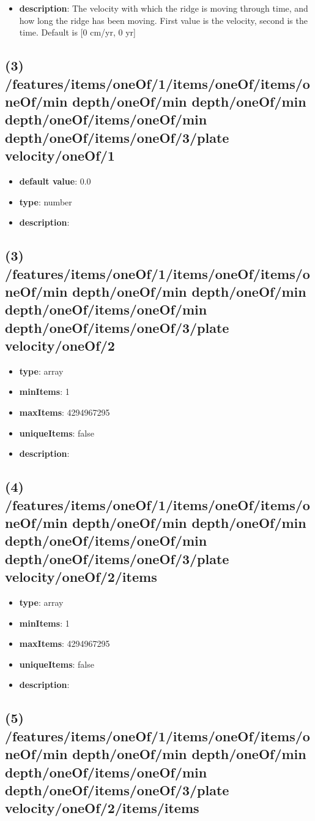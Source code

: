 \begin{itemize}[leftmargin=2em]\item {\bf description}: The velocity with which the ridge is moving through time, and how long the ridge has been moving. First value is the velocity, second is the time. Default is [0 cm/yr, 0 yr]
\end{itemize}
\subsection{(3) /features/items/oneOf/1/items/oneOf/items/oneOf/min depth/oneOf/min depth/oneOf/min depth/oneOf/items/oneOf/min depth/oneOf/items/oneOf/3/plate velocity/oneOf/1}
\begin{itemize}[leftmargin=3em]\item {\bf default value}: 0.0
\item {\bf type}: number
\item {\bf description}: 
\end{itemize}\subsection{(3) /features/items/oneOf/1/items/oneOf/items/oneOf/min depth/oneOf/min depth/oneOf/min depth/oneOf/items/oneOf/min depth/oneOf/items/oneOf/3/plate velocity/oneOf/2}
\begin{itemize}[leftmargin=3em]\item {\bf type}: array
\item {\bf minItems}: 1
\item {\bf maxItems}: 4294967295
\item {\bf uniqueItems}: false
\item {\bf description}: 
\end{itemize}\subsection{(4) /features/items/oneOf/1/items/oneOf/items/oneOf/min depth/oneOf/min depth/oneOf/min depth/oneOf/items/oneOf/min depth/oneOf/items/oneOf/3/plate velocity/oneOf/2/items}
\begin{itemize}[leftmargin=4em]\item {\bf type}: array
\item {\bf minItems}: 1
\item {\bf maxItems}: 4294967295
\item {\bf uniqueItems}: false
\item {\bf description}: 
\end{itemize}\subsection{(5) /features/items/oneOf/1/items/oneOf/items/oneOf/min depth/oneOf/min depth/oneOf/min depth/oneOf/items/oneOf/min depth/oneOf/items/oneOf/3/plate velocity/oneOf/2/items/items}
